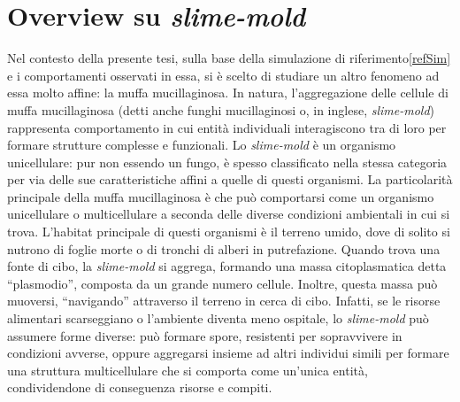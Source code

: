 \section{Overview su \textit{slime-mold}}
Nel contesto della presente tesi, sulla base della simulazione di riferimento\ref{refSim} e i comportamenti osservati in essa, si è scelto di studiare un altro 
fenomeno ad essa molto affine: la muffa mucillaginosa.
In natura, l'aggregazione delle cellule di muffa mucillaginosa (detti anche funghi mucillaginosi o, in inglese, \textit{slime-mold}) rappresenta
comportamento in cui entità individuali interagiscono tra di loro per formare strutture complesse e funzionali. 
Lo \textit{slime-mold} è un organismo unicellulare:
pur non essendo un fungo, è spesso classificato nella stessa categoria per via delle sue caratteristiche affini a quelle di questi organismi.
La particolarità principale della muffa mucillaginosa è che può comportarsi come un organismo unicellulare o multicellulare a seconda delle diverse 
condizioni ambientali in cui si trova.
L'habitat principale di questi organismi è il terreno umido, dove di solito si nutrono di foglie morte o di tronchi di alberi in putrefazione.
Quando trova una fonte di cibo, la \textit{slime-mold} si aggrega, formando una massa citoplasmatica detta ``plasmodio'', composta da un grande numero cellule. Inoltre,
questa massa può muoversi, ``navigando'' attraverso il terreno in cerca di cibo.
Infatti, se le risorse alimentari scarseggiano o l'ambiente diventa meno ospitale, lo \textit{slime-mold} può assumere forme diverse: può formare spore, 
resistenti per sopravvivere in condizioni avverse, oppure aggregarsi insieme ad altri individui simili per formare una struttura multicellulare
che si comporta come un'unica entità, condividendone di conseguenza risorse e compiti.

